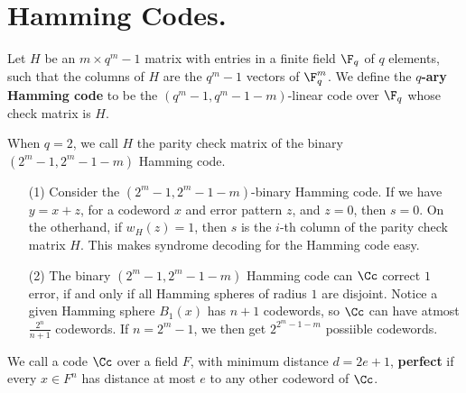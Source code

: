 
\section{Hamming Codes.}
\label{section1}

\begin{definition}
    Let $H$ be an  $m \times q^m-1$ matrix with entries in a finite field $\F_q$
    of  $q$ elements, such that the columns of  $H$ are the  $q^m-1$ vectors of
     $\F_q^m$. We define the \textbf{$q$-ary Hamming code} to be the
     $(q^m-1,q^m-1-m)$-linear code over $\F_q$ whose check matrix is $H$.
\end{definition}
\begin{remark}
    When $q=2$, we call  $H$ the parity check matrix of the binary
    $(2^m-1,2^m-1-m)$ Hamming code.
\end{remark}

\begin{definition}
    \begin{enumerate}
        \item[(1)] Consider the $(2^m-1,2^m-1-m)$-binary Hamming code. If we
            have $y=x+z$, for a codeword  $x$ and error pattern  $z$, and
            $z=0$, then  $s=0$. On the otherhand, if  $w_H(z)=1$, then $s$ is
            the  $i$-th column of the parity check matrix $H$.  This makes
            syndrome decoding for the Hamming code easy.

        \item [(2)] The binary $(2^m-1,2^m-1-m)$ Hamming code can $\Cc$ correct
            $1$ error, if and only if all Hamming spheres of radius  $1$ are
            disjoint. Notice a  given Hamming sphere $B_1(x)$ has $n+1$
            codewords, so $\Cc$  can have atmost  $\frac{2^n}{n+1}$ codewords.
            If $n=2^m-1$, we then get  $2^{2^m-1-m}$ possiible codewords.
    \end{enumerate}
\end{definition}

\begin{definition}
    We call a code $\Cc$ over a field $F$, with minimum distance $d=2e+1$,
    \textbf{perfect} if every $x \in F^n$ has distance at most  $e$ to any other
    codeword of  $\Cc$.
\end{definition}
